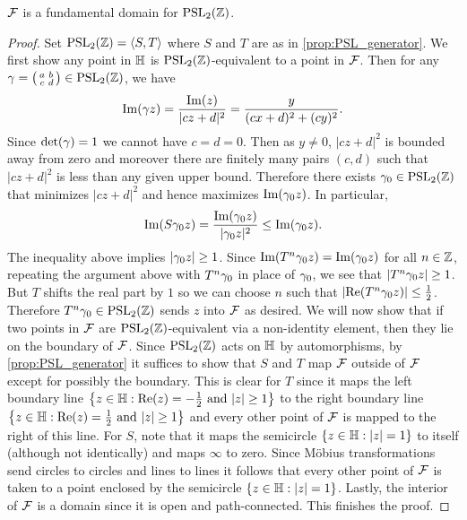     \begin{proposition}\label{prop:fundamental_domain_modular_group}
      $\mathcal{F}$ is a fundamental domain for $\mathrm{PSL}_{2}(\mathbb{Z})$.
    \end{proposition}
    \begin{proof}
      Set $\mathrm{PSL}_{2}(\mathbb{Z}) = \langle S,T\rangle$ where $S$ and $T$ are as in \cref{prop:PSL_generator}. We first show any point in $\mathbb{H}$ is $\mathrm{PSL}_{2}(\mathbb{Z})$-equivalent to a point in $\mathcal{F}$. Then for any $\gamma = \begin{psmallmatrix} a & b \\ c & d \end{psmallmatrix} \in \mathrm{PSL}_{2}(\mathbb{Z})$, we have
      \[
        \mathrm{Im}(\gamma z) = \frac{\mathrm{Im}(z)}{|cz+d|^{2}} = \frac{y}{(cx+d)^{2}+(cy)^{2}}.
      \]
      Since $\det(\gamma) = 1$ we cannot have $c = d = 0$. Then as $y \neq 0$, $|cz+d|^{2}$ is bounded away from zero and moreover there are finitely many pairs $(c,d)$ such that $|cz+d|^{2}$ is less than any given upper bound. Therefore there exists $\gamma_{0} \in \mathrm{PSL}_{2}(\mathbb{Z})$ that minimizes $|cz+d|^{2}$ and hence maximizes $\mathrm{Im}(\gamma_{0}z)$. In particular,
      \[
        \mathrm{Im}(S\gamma_{0}z) = \frac{\mathrm{Im}(\gamma_{0}z)}{|\gamma_{0}z|^{2}} \le \mathrm{Im}(\gamma_{0}z).
      \]
      The inequality above implies $|\gamma_{0}z| \ge 1$. Since $\mathrm{Im}(T^{n}\gamma_{0}z) = \mathrm{Im}(\gamma_{0}z)$ for all $n \in \mathbb{Z}$, repeating the argument above with $T^{n}\gamma_{0}$ in place of $\gamma_{0}$, we see that $|T^{n}\gamma_{0}z| \ge 1$. But $T$ shifts the real part by $1$ so we can choose $n$ such that $|\mathrm{Re}(T^{n}\gamma_{0}z)| \le \frac{1}{2}$. Therefore $T^{n}\gamma_{0} \in \mathrm{PSL}_{2}(\mathbb{Z})$ sends $z$ into $\mathcal{F}$ as desired. We will now show that if two points in $\mathcal{F}$ are $\mathrm{PSL}_{2}(\mathbb{Z})$-equivalent via a non-identity element, then they lie on the boundary of $\mathcal{F}$. Since $\mathrm{PSL}_{2}(\mathbb{Z})$ acts on $\mathbb{H}$ by automorphisms, by \cref{prop:PSL_generator} it suffices to show that $S$ and $T$ map $\mathcal{F}$ outside of $\mathcal{F}$ except for possibly the boundary. This is clear for $T$ since it maps the left boundary line $\left\{z \in \mathbb{H}:\text{$\mathrm{Re}(z) = -\frac{1}{2}$ and $|z| \ge 1$}\right\}$ to the right boundary line $\left\{z \in \mathbb{H}:\text{$\mathrm{Re}(z) = \frac{1}{2}$ and $|z| \ge 1$}\right\}$ and every other point of $\mathcal{F}$ is mapped to the right of this line. For $S$, note that it maps the semicircle $\{z \in \mathbb{H}:|z| = 1\}$ to itself (although not identically) and maps $\infty$ to zero. Since M\"obius transformations send circles to circles and lines to lines it follows that every other point of $\mathcal{F}$ is taken to a point enclosed by the semicircle $\{z \in \mathbb{H}:|z| = 1\}$. Lastly, the interior of $\mathcal{F}$ is a domain since it is open and path-connected. This finishes the proof.
    \end{proof}


